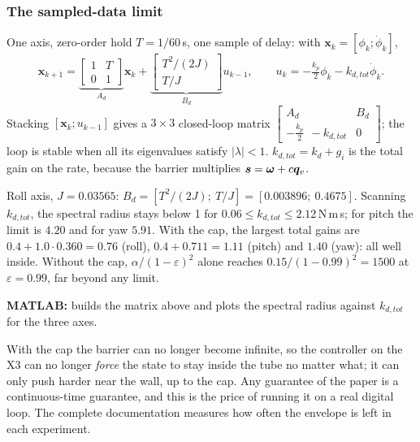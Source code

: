 \subsubsection*{The sampled-data limit}
One axis, zero-order hold $T=1/60$\,s, one sample of delay: with $\bm x_k=[\phi_k;\dot\phi_k]$,
\[
\bm x_{k+1}=\underbrace{\begin{bmatrix}1&T\\0&1\end{bmatrix}}_{A_d}\bm x_k+\underbrace{\begin{bmatrix}T^2/(2J)\\T/J\end{bmatrix}}_{B_d}u_{k-1},\qquad
u_k=-\tfrac{k_p}{2}\phi_k-k_{d,tot}\dot\phi_k .
\]
Stacking $[\bm x_k;u_{k-1}]$ gives a $3\times3$ closed-loop matrix
$\begin{bmatrix}A_d&B_d\\-\tfrac{k_p}{2}\ \ -k_{d,tot}&0\end{bmatrix}$; the loop is stable when all its eigenvalues satisfy $|\lambda|<1$.
$k_{d,tot}=k_d+g_i$ is the total gain on the rate, because the barrier multiplies $\bm{s}=\bm{\omega}+c\bm{q}_v$.

\begin{toybox}
Roll axis, $J=0.03565$: $B_d=[T^2/(2J);\ T/J]=[0.003896;\ 0.4675]$. Scanning $k_{d,tot}$, the spectral radius stays below 1
for $0.06\le k_{d,tot}\le\mathbf{2.12}$\,N\,m\,s; for pitch the limit is $4.20$ and for yaw $5.91$. With the cap, the largest
total gains are $0.4+1.0\cdot0.360=0.76$ (roll), $0.4+0.711=1.11$ (pitch) and $1.40$ (yaw): all well inside. Without
the cap, $\alpha/(1-\varepsilon)^2$ alone reaches $0.15/(1-0.99)^2=1500$ at $\varepsilon=0.99$, far beyond any limit.
\end{toybox}

\begin{codebox}
\textbf{MATLAB:}  builds the matrix above and plots the spectral radius against
$k_{d,tot}$ for the three axes.
\end{codebox}

\begin{warn}
With the cap the barrier can no longer become infinite, so the controller on the X3 can no longer \emph{force} the state
to stay inside the tube no matter what; it can only push harder near the wall, up to the cap. Any guarantee of the
paper is a continuous-time guarantee, and this is the price of running it on a real digital loop. The complete
documentation measures how often the envelope is left in each experiment.
\end{warn}

